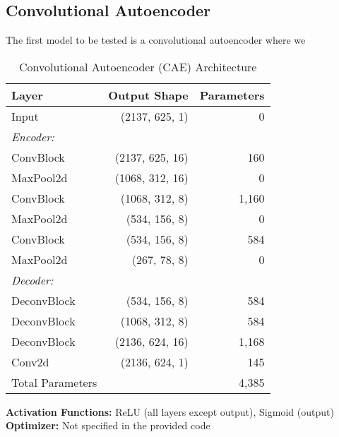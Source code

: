 \subsection{Convolutional Autoencoder}
\label{resdis:tiny-cae}

The first model to be tested is a convolutional autoencoder  where we

\begin{table}[ht]
    \centering
    \caption{Convolutional Autoencoder (CAE) Architecture}
    \begin{tabular}{lrr}
        \toprule
        Layer & Output Shape & Parameters \\
        \midrule
        Input & (2137, 625, 1) & 0 \\
        \multicolumn{3}{l}{\textit{Encoder:}} \\
        ConvBlock & (2137, 625, 16) & 160 \\
        MaxPool2d & (1068, 312, 16) & 0 \\
        ConvBlock & (1068, 312, 8) & 1,160 \\
        MaxPool2d & (534, 156, 8) & 0 \\
        ConvBlock & (534, 156, 8) & 584 \\
        MaxPool2d & (267, 78, 8) & 0 \\
        \multicolumn{3}{l}{\textit{Decoder:}} \\
        DeconvBlock & (534, 156, 8) & 584 \\
        DeconvBlock & (1068, 312, 8) & 584 \\
        DeconvBlock & (2136, 624, 16) & 1,168 \\
        Conv2d & (2136, 624, 1) & 145 \\
        \midrule
        Total Parameters & & 4,385 \\
        \bottomrule
    \end{tabular}
    \label{tab:cae}
\end{table}

\textbf{Activation Functions:} ReLU (all layers except output), Sigmoid (output)\\
\textbf{Optimizer:} Not specified in the provided code
